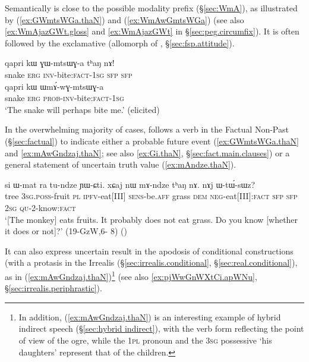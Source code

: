 Semantically  is close to the possible modality prefix (§\ref{sec:WmA}), as illustrated by (\ref{ex:GWmtsWGa.thaN}) and (\ref{ex:WmAwGmtsWGa}) (see also  \ref{ex:WmAjazGWt.gloss} and \ref{ex:WmAjazGWt} in §\ref{sec:peg.circumfix}). It is often followed by the exclamative  (allomorph of , §\ref{sec:fsp.attitude}).
  
\begin{exe}
\ex 
\begin{xlist}
 \ex \label{ex:GWmtsWGa.thaN}
\gll qapri kɯ ɣɯ-mtsɯɣ-a tʰaŋ nɤ! \\
 snake \textsc{erg} \textsc{inv}-bite:\textsc{fact}-\textsc{1sg} \textsc{sfp} \textsc{sfp} \\
 \ex \label{ex:WmAwGmtsWGa}
\gll  qapri kɯ ɯmɤ́-wɣ-mtsɯɣ-a \\
 snake \textsc{erg} \textsc{prob}-\textsc{inv}-bite:\textsc{fact}-\textsc{1sg} \\
 \glt `The snake will perhaps bite me.' (elicited)
 \end{xlist}
 \end{exe} 

In the overwhelming majority of cases,  follows a verb in the Factual Non-Past (§\ref{sec:factual}) to indicate either a probable future event (\ref{ex:GWmtsWGa.thaN} and \ref{ex:mAwGndzaj.thaN}; see also \ref{ex:Gi.thaN}, §\ref{sec:fact.main.clauses}) or a general statement of uncertain truth value (\ref{ex:mAndze.thaN}).

\begin{exe}
\ex \label{ex:mAndze.thaN}
\gll si ɯ-mat ra tu-ndze ɲɯ-ɕti.  xɕaj nɯ mɤ-ndze tʰaŋ nɤ. nɤj ɯ-tɯ́-sɯz? \\
 tree \textsc{3sg}.\textsc{poss}-fruit \textsc{pl} \textsc{ipfv}-eat[III] \textsc{sens}-be.\textsc{aff} grass \textsc{dem} \textsc{neg}-eat[III]:\textsc{fact} \textsc{sfp} \textsc{sfp}  \textsc{2sg} \textsc{qu}-2-know:\textsc{fact} \\
 \glt `[The monkey] eats fruits. It probably does not eat grass. Do you know [whether it does or not]?' (19-GzW,6- 8)
()
\end{exe} 
 
It can also express uncertain result in the apodosis of conditional constructions (with a protasis in the Irrealis (§\ref{sec:irrealis.conditional}, §\ref{sec:real.conditional}), as in (\ref{ex:mAwGndzaj.thaN})\footnote{In addition, (\ref{ex:mAwGndzaj.thaN}) is an interesting example of hybrid indirect speech (§\ref{sec:hybrid indirect}), with the verb form  reflecting the point of view of the ogre, while the \textsc{1pl} pronoun  and the \textsc{3sg} possessive   `his daughters' represent that of the children. } (see also \ref{ex:pjWwGnWXtCi.apWNu}, §\ref{sec:irrealis.periphrastic}).

